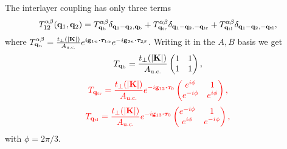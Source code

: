 The interlayer coupling has only three terms
$$
T_{12}^{\alpha\beta}({\vb{q}}_1,{\vb{q}}_2) =
T^{\alpha\beta}_{{\vb{q}}_\text{b}} \delta_{{\vb{q}}_1-{\vb{q}}_2, {\vb{q}}_\text{b}} +
T^{\alpha\beta}_{{\vb{q}}_\text{tr}} \delta_{{\vb{q}}_1-{\vb{q}}_2, -{\vb{q}}_\text{tr}} +
T^{\alpha\beta}_{{\vb{q}}_\text{tl}} \delta_{{\vb{q}}_1-{\vb{q}}_2, -{\vb{q}}_\text{tl}},
$$
where $T^{\alpha\beta}_{\q_n} = \frac{t_\perp(\abs{\K})}{A_{\text{u.c.}}} e^{i \g_{1n} \vdot \bm{\tau}_{1\alpha}}
e^{-i \g_{2n} \vdot \bm{\tau}_{2\beta}}$. Writing it in the $A, B$ basis we get
$$
T_{{\vb{q}}_\text{b}} = \frac{t_\perp(\abs{{\vb{K}}})}{A_{\text{u.c.}}}
\begin{pmatrix}
1 & 1 \\
1 & 1
\end{pmatrix},
$$
$$
\textcolor{red}{
T_{\q_\text{tr}} = \frac{t_\perp(\abs{\K})}{A_{\text{u.c.}}} e^{-i \g_{12} \vdot \vtau_0}
\begin{pmatrix}
e^{i\phi} & 1 \\
e^{-i\phi} & e^{i\phi}
\end{pmatrix},
}
$$
$$
\textcolor{red}{
T_{\q_\text{tl}} = \frac{t_\perp(\abs{\K})}{A_{\text{u.c.}}} e^{-i \g_{13} \vdot \vtau_0}
\begin{pmatrix}
e^{-i\phi} & 1 \\
e^{i\phi} & e^{-i\phi}
\end{pmatrix},
}
$$
with $\phi = 2\pi/3$.
